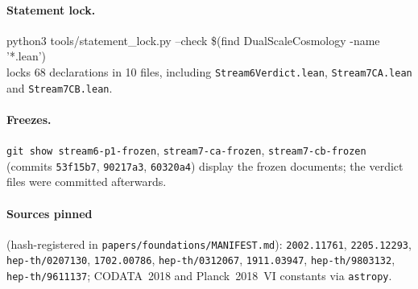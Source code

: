 \documentclass[11pt,a4paper]{article}
\theoremstyle{remark}
\begin{document}
\paragraph{Statement lock.}
{\footnotesize\ttfamily python3 tools/statement\_lock.py --check \$(find DualScaleCosmology -name '*.lean')}\\
locks 68 declarations in 10 files, including \texttt{Stream6Verdict.lean}, \texttt{Stream7CA.lean} and
\texttt{Stream7CB.lean}.

\paragraph{Freezes.} \texttt{git show stream6-p1-frozen}, \texttt{stream7-ca-frozen}, \texttt{stream7-cb-frozen}
(commits \texttt{53f15b7}, \texttt{90217a3}, \texttt{60320a4}) display the frozen documents; the verdict files were
committed afterwards.

\paragraph{Sources pinned} (hash-registered in \texttt{papers/foundations/MANIFEST.md}): \texttt{2002.11761},
\texttt{2205.12293}, \texttt{hep-th/0207130}, \texttt{1702.00786}, \texttt{hep-th/0312067}, \texttt{1911.03947},
\texttt{hep-th/9803132}, \texttt{hep-th/9611137}; CODATA~2018 and Planck~2018~VI constants via \texttt{astropy}.
\end{document}
